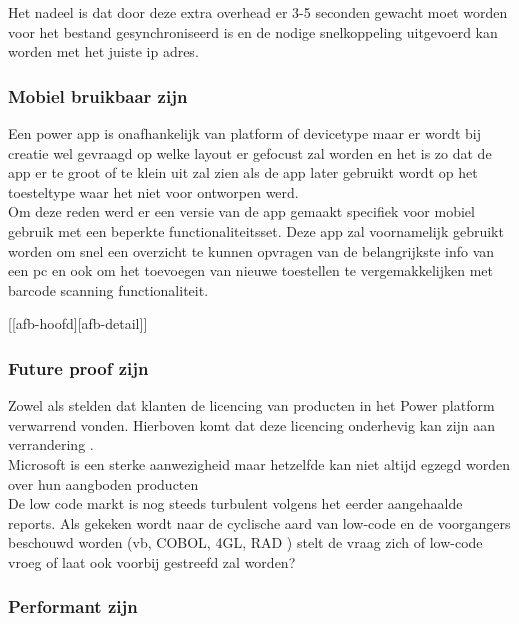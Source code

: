 Het nadeel is dat door deze extra overhead er 3-5 seconden gewacht moet worden voor het bestand gesynchroniseerd is en de nodige snelkoppeling uitgevoerd kan worden met het juiste ip adres.

\subsubsection{Mobiel bruikbaar zijn}

Een power app is onafhankelijk van platform of devicetype maar er wordt bij creatie wel gevraagd op welke layout er gefocust zal worden en het is zo dat de app er te groot of te klein uit zal zien als de app later gebruikt wordt op het toesteltype waar het niet voor ontworpen werd.\\
Om deze reden werd er een versie van de app gemaakt specifiek voor mobiel gebruik met een beperkte functionaliteitsset. Deze app zal voornamelijk gebruikt worden om snel een overzicht te kunnen opvragen van de belangrijkste info van een pc en ook om het toevoegen van nieuwe toestellen te vergemakkelijken met barcode scanning functionaliteit.

[[afb-hoofd][afb-detail]]

\subsubsection{Future proof zijn}

Zowel \textcite{Rymer2019} als \textcite{Vincent2019} stelden dat klanten de licencing van producten in het Power platform verwarrend vonden. Hierboven komt dat deze licencing onderhevig kan zijn aan verrandering \autocite{Pohl2019}.\\
Microsoft is een sterke aanwezigheid maar hetzelfde kan niet altijd egzegd worden over hun aangboden producten \autocite{Bott2018}\\
De low code markt is nog steeds turbulent volgens het eerder aangehaalde reports.
Als gekeken wordt naar de cyclische aard van low-code en de voorgangers beschouwd worden (vb, COBOL, 4GL, RAD ) stelt de vraag zich of low-code vroeg of laat ook voorbij gestreefd zal worden? \autocite{Reselman2018}

\subsubsection{Performant zijn}

